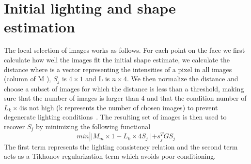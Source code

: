 \documentclass[10pt,twocolumn,letterpaper]{article}
\begin{document}
\section{Initial lighting and shape estimation}
The local selection of images works as follows. For each point on the face we first calculate how well the images fit the initial shape estimate, we calculate the distance where is a vector representing the intensities of a pixel in all images (column of M ), $S_j$ is
$4 \times 1$ and L is $n\times4$. We then normalize the distance and choose a subset of images for which the distance is less than a threshold, making sure that the number of images is larger than 4 and that the condition number of $L_k\times4 $is not high (k represents the number of chosen images) to prevent degenerate lighting conditions~\cite{Liu2016Joint}. The resulting set of images is then used to recover $S_j$ by minimizing the following functional
\begin{equation}
 min\left|| M_m\times1-L_k\times4S_j\right||+s_j^T GS_j
\end{equation}
The first term represents the lighting consistency relation and the second term acts as a Tikhonov regularization term which avoids poor conditioning.
{\small


}
\end{document}
